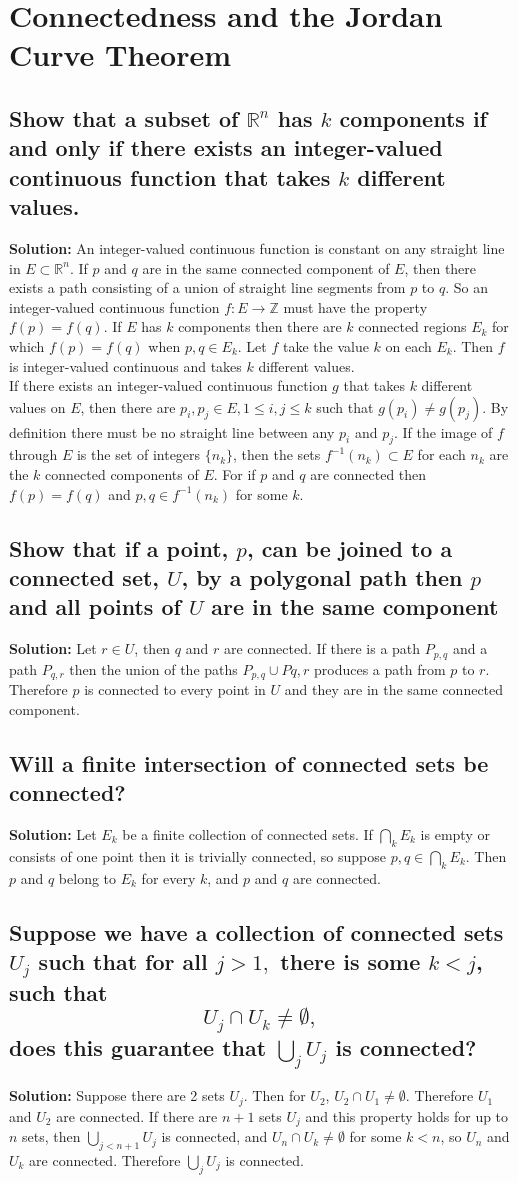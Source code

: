 \documentclass{article}
\newcommand{\exercise}[1]{\subsection{\normalfont #1}}
\newcommand{\solution}{\indent\indent \textbf{Solution: }}
\begin{document}
\section{Connectedness and the Jordan Curve Theorem}
\exercise{Show that a subset of $\mathbb{R}^n$ has $k$ components if and only if there exists an integer-valued continuous function that takes $k$ different values.} %
\solution
An integer-valued continuous function is constant on any straight line in $E\subset \mathbb{R}^n$. If $p$ and $q$ are in the same connected component of $E$, then there exists a path consisting of a union of straight line segments from $p$ to $q$. So an integer-valued continuous function $f\colon E\to \mathbb{Z}$ must have the property $f(p) = f(q)$. If $E$ has $k$ components then there are $k$ connected regions $E_k$ for which $f(p) = f(q)$ when $p, q \in E_k$. Let $f$ take the value $k$ on each $E_k$. Then $f$ is integer-valued continuous and takes $k$ different values. \\
\indent If there exists an integer-valued continuous function $g$ that takes $k$ different values on $E$, then there are $p_i, p_j\in E, 1\leq i, j\leq k$ such that $g(p_i)\neq g(p_j)$. By definition there must be no straight line between any $p_i$ and $p_j$. If the image of $f$ through $E$ is the set of integers $\{n_k\}$, then the sets $f^{-1}(n_k)\subset E$ for each $n_k$ are the $k$ connected components of $E$. For if $p$ and $q$ are connected then $f(p) = f(q)$ and $p,q\in f^{-1}(n_k)$ for some $k$. 

\exercise{Show that if a point, $p$, can be joined to a connected set, $U$, by a polygonal path then $p$ and all points of $U$ are in the same component} %
\solution Let $r\in U$, then $q$ and $r$ are connected. If there is a path $P_{p,q}$ and a path $P_{q,r}$ then the union of the paths $P_{p,q} \cup P{q, r}$ produces a path from $p$ to $r$. Therefore $p$ is connected to every point in $U$ and they are in the same connected component.

\exercise{Will a finite intersection of connected sets be connected?} 
\solution Let $E_k$ be a finite collection of connected sets. If $\bigcap_k E_k$ is empty or consists of one point then it is trivially connected, so suppose $p, q \in \bigcap_k E_k$. Then $p$ and $q$ belong to $E_k$ for every $k$, and $p$ and $q$ are connected. 

\exercise{Suppose we have a collection of connected sets $U_j$ such that for all $j>1,$ there is some $k<j$, such that $$U_j\cap U_k \neq \emptyset,$$ does this guarantee that $\bigcup_j U_j$ is connected?} %
\solution Suppose there are 2 sets $U_j$. Then for $U_2$,  $U_2\cap U_1 \neq \emptyset$. Therefore $U_1$ and $U_2$ are connected. If there are $n+1$ sets $U_j$ and this property holds for up to $n$ sets, then $\bigcup_{j<n+1} U_j$ is connected, and $U_n \cap U_k \neq \emptyset$ for some $k<n$, so $U_n$ and $U_k$ are connected. Therefore $\bigcup_j U_j$ is connected. 
\end{document}
